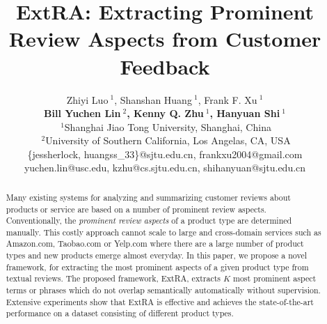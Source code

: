\documentclass[11pt,a4paper]{article}
\title{ExtRA: Extracting Prominent Review Aspects from Customer Feedback}
\newcommand{\ZY}[1]{\textcolor{blue}{Zhiyi: #1}}
\begin{document}
\author{
	Zhiyi Luo{\small $~^{1}$}, Shanshan Huang{\small $~^{1}$}, Frank F. Xu{\small $~^{1}$}\\
	\textbf{ Bill Yuchen Lin{\small $~^{2}$}, Kenny Q. Zhu{\small $~^{1}$}, Hanyuan Shi{\small $~^{1}$} }\\
	{\small $~^{1}$}Shanghai Jiao Tong University, Shanghai, China\\
	{\small $~^{2}$}University of Southern California, Los Angelas, CA, USA\\
	\{jessherlock,
	huangss\_33\}@sjtu.edu.cn,
	frankxu2004@gmail.com\\
	yuchen.lin@usc.edu,
	kzhu@cs.sjtu.edu.cn,
	shihanyuan@sjtu.edu.cn \\
}



\maketitle

\begin{abstract}
Many existing systems for analyzing and summarizing customer reviews about 
products or service are based on a number of prominent review aspects. 
Conventionally, the {\em prominent review aspects} of a product type 
are determined manually. This costly approach cannot scale to large and 
cross-domain services such as Amazon.com, Taobao.com or Yelp.com where 
there are a large number of product types and
new products emerge almost everyday. 
In this paper, we propose a novel framework, for extracting the 
most prominent aspects of a given product type  from textual reviews. 
The proposed framework, ExtRA, extracts $K$ most prominent aspect terms 
or phrases which do not overlap semantically automatically without
supervision.
Extensive experiments show that ExtRA is effective and achieves the state-of-the-art performance on a dataset consisting of different product types. 
\end{abstract}
\end{document}

